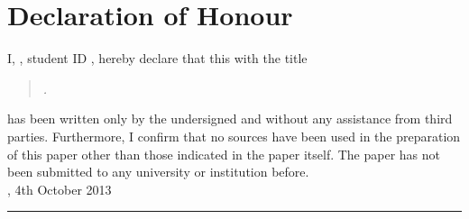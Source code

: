 
\chapter*{Declaration of Honour}

\thispagestyle{empty}

I, \myAuthor, student ID \studentID, hereby declare that this \kind\xspace with the title

\begin{quote}
\textit{\myTitle. \mySubtitle}
\end{quote}

has been written only by the undersigned and without any assistance from third parties.
Furthermore, I confirm that no sources have been used in the preparation of this paper other than those indicated in the paper itself. The paper has not been submitted to any university or institution before. \\[6ex]

\place, 4th October 2013\\[3ex]


\rule[-0.2cm]{5cm}{0.5pt}

\textsc{\myAuthor} 
